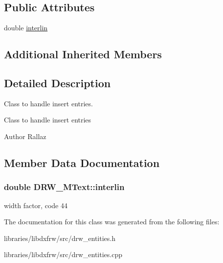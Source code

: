 \subsection*{Public Attributes}
\begin{DoxyCompactItemize}
\item 
double \hyperlink{classDRW__MText_a60c7259ea36123406c5270dcd5434efa}{interlin}
\end{DoxyCompactItemize}
\subsection*{Additional Inherited Members}


\subsection{Detailed Description}
Class to handle insert entries. 

Class to handle insert entries \begin{DoxyAuthor}{Author}
Rallaz 
\end{DoxyAuthor}


\subsection{Member Data Documentation}
\hypertarget{classDRW__MText_a60c7259ea36123406c5270dcd5434efa}{
\subsubsection[{interlin}]{\setlength{\rightskip}{0pt plus 5cm}double D\-R\-W\-\_\-\-M\-Text\-::interlin}}\label{classDRW__MText_a60c7259ea36123406c5270dcd5434efa}
width factor, code 44 

The documentation for this class was generated from the following files\-:\begin{DoxyCompactItemize}
\item 
libraries/libdxfrw/src/drw\-\_\-entities.\-h\item 
libraries/libdxfrw/src/drw\-\_\-entities.\-cpp\end{DoxyCompactItemize}
